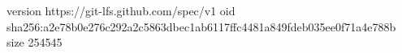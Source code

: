 version https://git-lfs.github.com/spec/v1
oid sha256:a2e78b0e276c292a2c5863dbec1ab6117ffc4481a849fdeb035ee0f71a4e788b
size 254545
